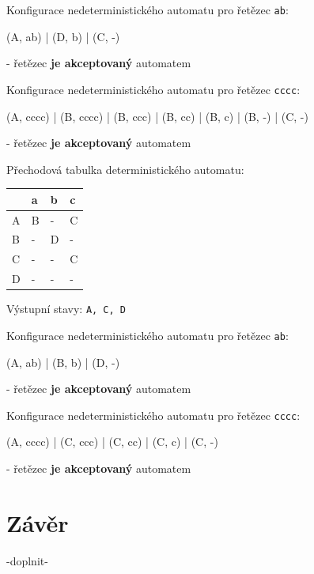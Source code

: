 \documentclass[11pt]{article}
\begin{document}
\bigskip

Konfigurace nedeterministického automatu pro řetězec \texttt{ab}:

(A, ab) | (D, b) | (C, -)

- řetězec \textbf{je akceptovaný} automatem

\bigskip

Konfigurace nedeterministického automatu pro řetězec \texttt{cccc}:

(A, cccc) | (B, cccc) | (B, ccc) | (B, cc) | (B, c) | (B, -) | (C, -)

- řetězec \textbf{je akceptovaný} automatem

\bigskip

Přechodová tabulka deterministického automatu:

\bigskip

\begin{tabular}{| l | l | l | l |}
\hline
  & a & b & c \\ \hline
A & B & - & C \\ \hline
B & - & D & - \\ \hline
C & - & - & C \\ \hline
D & - & - & - \\
\hline
\end{tabular}

\bigskip

Výstupní stavy: \texttt{A, C, D}

\bigskip

Konfigurace nedeterministického automatu pro řetězec \texttt{ab}:

(A, ab) | (B, b) | (D, -)

- řetězec \textbf{je akceptovaný} automatem

\bigskip

Konfigurace nedeterministického automatu pro řetězec \texttt{cccc}:

(A, cccc) | (C, ccc) | (C, cc) | (C, c) | (C, -)

- řetězec \textbf{je akceptovaný} automatem

\newpage

\section{Závěr}

-doplnit-
\end{document}
